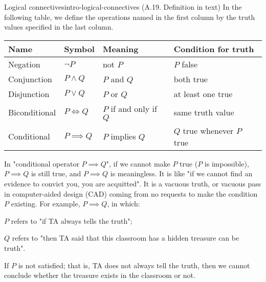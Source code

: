 \documentclass[../src/handouts/main.tex]{subfiles}
\begin{document}
\begin{definition}{Logical connectives}{intro-logical-connectives}
  (A.19. Definition in text)
  In the following table, we define the operations named in the first column by the truth values specified in the last column.

  \centering
  \begin{tabular}{l|lll}
    Name          & Symbol         & Meaning                & Condition for truth        \\ \hline
    Negation      & $\neg P$       & not $P$                & $P$ false                  \\
    Conjunction   & $P \wedge Q$   & $P$ and $Q$            & both true                  \\
    Disjunction   & $P \vee Q$     & $P$ or $Q$             & at least one true          \\
    Biconditional & $P \iff Q$     & $P$ if and only if $Q$ & same truth value           \\
    Conditional   & $P \implies Q$ & $P$ implies $Q$        & $Q$ true whenever $P$ true
  \end{tabular}
\end{definition}

In "conditional operator $P \implies Q$", if we cannot make $P$ true ($P$ is impossible), $P \implies Q$ is still true, and $P \implies Q$ is meaningless. It is like "if we cannot find an evidence to convict you, you are acquitted". It is a vacuous truth, or vacuous pass in computer-aided design (CAD) coming from no requests to make the condition $P$ existing. For example, $P \implies Q$, in which:
\begin{enumerate*}
  \item $P$ refers to "if TA always tells the truth";
  \item $Q$ refers to "then TA said that this classroom has a hidden treasure can be truth".
\end{enumerate*}
If $P$ is not satisfied; that is, TA does not always tell the truth, then we cannot conclude whether the treasure exists in the classroom or not.
\end{document}
